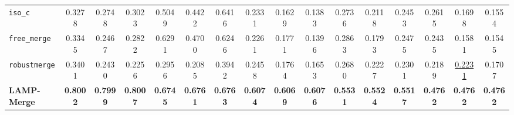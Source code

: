 \begin{table}[t]
\begin{tabular}{lccccccccccccccc}
\texttt{iso\_c} & 0.3278 & 0.2748 & 0.3023 & 0.5049 & 0.4422 & 0.6416 & 0.2331 & 0.1629 & 0.1383 & 0.2736 & 0.2118 & 0.2453 & 0.2615 & 0.1698 & 0.1554 \\
\texttt{free\_merge} & 0.3345 & 0.2467 & 0.2822 & 0.6291 & 0.4700 & 0.6246 & 0.2261 & 0.1771 & 0.1396 & 0.2863 & 0.1793 & 0.2475 & 0.2435 & 0.1581 & 0.1545 \\
\texttt{robustmerge} & 0.3401 & 0.2430 & 0.2256 & 0.2956 & 0.2085 & 0.3942 & 0.2458 & 0.1764 & 0.1653 & 0.2680 & 0.2227 & 0.2301 & 0.2189 & \underline{0.2231} & 0.1707 \\
\textbf{LAMP-Merge} & \textbf{0.8002} & \textbf{0.7999} & \textbf{0.8007} & \textbf{0.6745} & \textbf{0.6761} & \textbf{0.6763} & \textbf{0.6074} & \textbf{0.6069} & \textbf{0.6076} & \textbf{0.5531} & \textbf{0.5524} & \textbf{0.5517} & \textbf{0.4762} & \textbf{0.4762} & \textbf{0.4762} \\
\bottomrule
\end{tabular}
\end{table}

